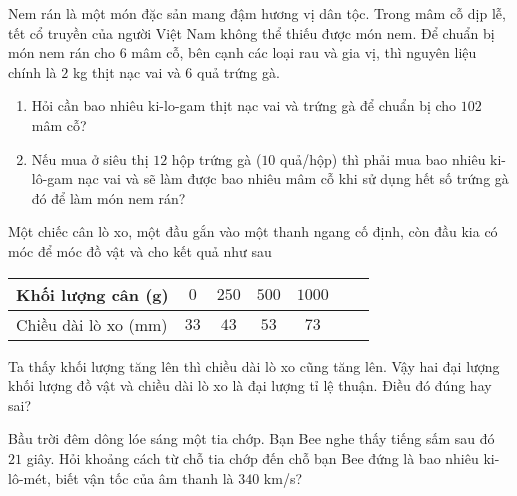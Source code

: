 \begin{bt}%
	Nem rán là một món đặc sản mang đậm hương vị dân tộc. Trong mâm cỗ dịp lễ, tết cổ truyền của người Việt Nam không thể thiếu được món nem. Để chuẩn bị món nem rán cho $6$ mâm cỗ, bên cạnh các loại rau và gia vị, thì nguyên liệu chính là $2$ kg thịt nạc vai và $6$ quả trứng gà.
	\begin{enumerate}
		\item Hỏi cần bao nhiêu ki-lo-gam thịt nạc vai và trứng gà để chuẩn bị cho $102$ mâm cỗ?
		\item Nếu mua ở siêu thị $12$ hộp trứng gà ($10$ quả/hộp) thì phải mua bao nhiêu ki-lô-gam nạc vai và sẽ làm được bao nhiêu mâm cỗ khi sử dụng hết số trứng gà đó để làm món nem rán?
	\end{enumerate}
\end{bt}

\begin{bt}%
	Một chiếc cân lò xo, một đầu gắn vào một thanh ngang cố định, còn đầu kia có móc để móc đồ vật và cho kết quả như sau
	\begin{center}
		\begin{tabular}{|l|c|c|c|c|c|c|}
			\hline  
			Khối lượng cân (g) & $0$ & $250$ & $500$ & $1000$ \\
			\hline 
			Chiều dài lò xo (mm) & $33$ & $43$ & $53$ & $73$ \\ 
			\hline
		\end{tabular}
	\end{center}
	Ta thấy khối lượng tăng lên thì chiều dài lò xo cũng tăng lên. Vậy hai đại lượng khối lượng đồ vật và chiều dài lò xo là đại lượng tỉ lệ thuận. Điều đó đúng hay sai?
\end{bt}

\begin{bt}%
	Bầu trời đêm dông lóe sáng một tia chớp. Bạn Bee nghe thấy tiếng sấm sau đó $21$ giây. Hỏi khoảng cách từ chỗ tia chớp đến chỗ bạn Bee đứng là bao nhiêu ki-lô-mét, biết vận tốc của âm thanh là $340$ km/s?
\end{bt}

